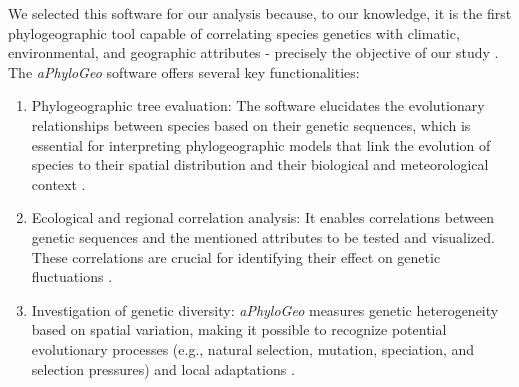 We selected this software for our analysis because, to our knowledge, it is the first phylogeographic tool capable of correlating species genetics with climatic, environmental, and geographic attributes - precisely the objective of our study \citep{koshkarov_phylogeography_2022}. The \textit{aPhyloGeo} software offers several key functionalities:

\begin{enumerate}[label=\arabic*.]
\item Phylogeographic tree evaluation: The software elucidates the evolutionary relationships between species based on their genetic sequences, which is essential for interpreting phylogeographic models that link the evolution of species to their spatial distribution and their biological and meteorological context \citep{koshkarov_phylogeography_2022}.
\item Ecological and regional correlation analysis: It enables correlations between genetic sequences and the mentioned attributes to be tested and visualized. These correlations are crucial for identifying their effect on genetic fluctuations \citep{koshkarov_phylogeography_2022}.
\item Investigation of genetic diversity: \textit{aPhyloGeo} measures genetic heterogeneity based on spatial variation, making it possible to recognize potential evolutionary processes (e.g., natural selection, mutation, speciation, and selection pressures) and local adaptations \citep{manel_perspectives_2010}.
\end{enumerate}

